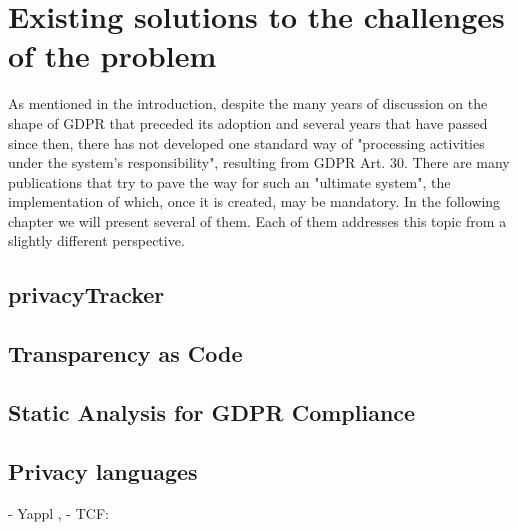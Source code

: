 \section{Existing solutions to the challenges of the problem}

As mentioned in the introduction, despite the many years of discussion on the shape of GDPR that preceded its adoption and several years that have passed since then, there has not developed one standard way of "processing activities under the system's responsibility", resulting from GDPR Art. 30. There are many publications that try to pave the way for such an "ultimate system", the implementation of which, once it is created, may be mandatory. In the following chapter we will present several of them. Each of them addresses this topic from a slightly different perspective.

\subsection{privacyTracker \cite{2016PrivacyTracker:Controls}}


\subsection{Transparency as Code \cite{ErnstTransparencyComputing}}


\subsection{Static Analysis for GDPR Compliance \cite{Spoto2018StaticCompliance}}


\subsection{Privacy languages}

     - Yappl \cite{Ulbricht2018YaPPLScenarios},
     - TCF: \cite{2019IABFramework-Policies}

